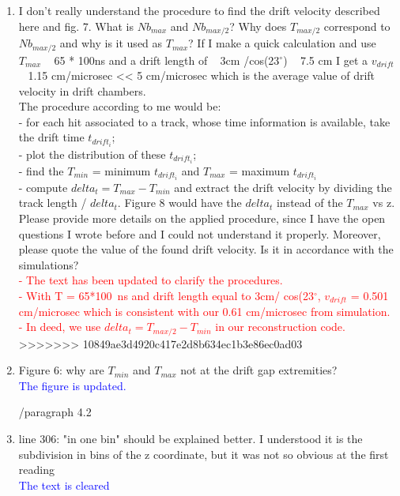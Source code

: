 \documentclass[a4paper,11pt,twoside]{article}
\begin{document}
\begin{enumerate}
\item I don't really understand the procedure to find the drift velocity 
   described here and fig. 7. What is $Nb_{max}$ and $Nb_{max/2}$? Why does 
   $T_{max/2}$ correspond to $Nb_{max/2}$ and why is it used as $T_{max}$? If I 
   make a quick calculation and use $T_{max}$ ~ 65 * 100ns and a drift length 
   of ~ 3cm /cos(23$^{\circ}$) ~ 7.5 cm I get a $v_{drift}$ ~ 1.15 cm/microsec 
   << 5 cm/microsec which is the average value of drift velocity in drift 
   chambers.\\
The procedure according to me would be:\\
- for each hit associated to a track, whose time information is available, take 
the drift time $t_{drift_{i}}$;\\
- plot the distribution of these $t_{drift_{i}}$;\\
- find the $T_{min}$ = minimum $t_{drift_{i}}$ and $T_{max}$ = maximum 
$t_{drift_{i}}$\\
- compute $delta_{t} = T_{max} - T_{min}$ and extract the drift velocity by 
dividing the track length / $delta_{t}$. Figure 8 would have the $delta_{t}$ 
instead of the $T_{max}$ vs z.\\
Please provide more details on the applied procedure, since I have the open 
questions I wrote before and I could not understand it properly. Moreover, 
please quote the value of the found drift velocity. Is it in accordance with 
the simulations?\\
\textcolor{red}{- The text has been updated to clarify the procedures.\\
                - With T = 65*100~ns and drift length equal to 3cm/ 
             cos(23$^{\circ}$, $v_{drift}$ = 0.501 cm/microsec which is 
          consistent with our 0.61 cm/microsec from simulation. \\
               - In deed, we use $delta_{t} = T_{max/2} - T_{min}$ in our 
            reconstruction code.} 
>>>>>>> 10849ae3d4920c417e2d8b634ec1b3e86ec0ad03

\item Figure 6: why are $T_{min}$ and $T_{max}$ not at the drift gap 
   extremities?\\
   \textcolor{blue}{The figure is updated.} 

        /paragraph 4.2

\item line 306: "in one bin" should be explained better. I understood it is the 
   subdivision in bins of the z coordinate, but it was not so obvious at the 
   first reading\\
\textcolor{blue}{The text is cleared} 


\end{enumerate}
\end{document}
